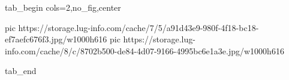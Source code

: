  
 
 
 
 


\ifcmt
  tab_begin cols=2,no_fig,center

     pic https://storage.lug-info.com/cache/7/5/a91d43e9-980f-4f18-bc18-ef7aefc676f3.jpg/w1000h616%
		 pic https://storage.lug-info.com/cache/8/c/8702b500-de84-4d07-9166-4995bc6e1a3e.jpg/w1000h616%

  tab_end
\fi
